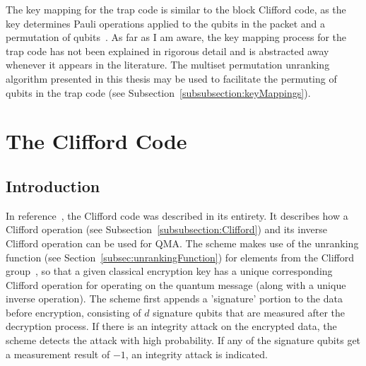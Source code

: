 The key mapping for the trap code is similar to the block Clifford code, as the key determines Pauli operations applied to the qubits in the packet and a permutation of qubits~\cite{broadbent2013quantum}. As far as I am aware, the key mapping process for the trap code has not been explained in rigorous detail and is abstracted away whenever it appears in the literature. The multiset permutation unranking algorithm presented in this thesis may be used to facilitate the permuting of qubits in the trap code (see Subsection~\ref{subsubsection:keyMappings}).



\section{The Clifford Code}
\label{sec:IntegrityDetectionUsingCliffordOperationEncryption}
\subsection{Introduction}
In reference~\cite{barbeau2022authenticity}, the Clifford code was described in its entirety. It describes how a Clifford operation (see Subsection~\ref{subsubsection:Clifford}) and its inverse Clifford operation can be used for QMA. The scheme makes use of the unranking function (see Section~\ref{subsec:unrankingFunction}) for elements from the Clifford group~\cite{Koenig2014}, so that a given classical encryption key has a unique corresponding Clifford operation for operating on the quantum message (along with a unique inverse operation). The scheme first appends a 'signature' portion to the data before encryption, consisting of $d$ signature qubits that are measured after the decryption process. If there is an integrity attack on the encrypted data, the scheme detects the attack with high probability. If any of the signature qubits get a measurement result of $-1$, an integrity attack is indicated.
